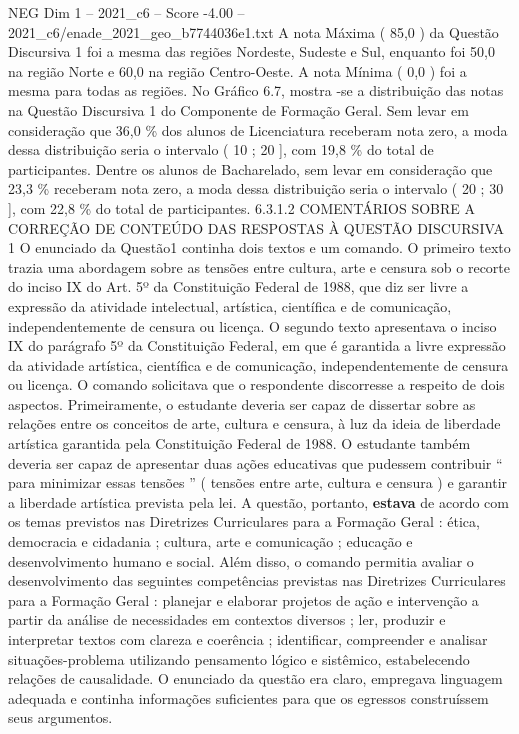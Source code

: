 \begin{textsample}{NEG Dim 1 – 2021\_c6 – Score -4.00 – 2021\_c6/enade\_2021\_geo\_b7744036e1.txt}
A nota Máxima ( 85,0 ) da Questão Discursiva 1 foi a mesma das regiões Nordeste, Sudeste e Sul, enquanto foi 50,0 na região Norte e 60,0 na região Centro-Oeste.
A nota Mínima ( 0,0 ) foi a mesma para todas as regiões.
No Gráfico 6.7, mostra -se a distribuição das notas na Questão Discursiva 1 do Componente de Formação Geral.
Sem levar em consideração que 36,0 \% dos alunos de Licenciatura receberam nota zero, a moda dessa distribuição seria o intervalo ( 10 ; 20 ], com 19,8 \% do total de participantes.
Dentre os alunos de Bacharelado, sem levar em consideração que 23,3 \% receberam nota zero, a moda dessa distribuição seria o intervalo ( 20 ; 30 ], com 22,8 \% do total de participantes. 6.3.1.2 COMENTÁRIOS SOBRE A CORREÇÃO DE CONTEÚDO DAS RESPOSTAS À QUESTÃO DISCURSIVA 1 O enunciado da Questão1 continha dois textos e um comando.
O primeiro texto trazia uma abordagem sobre as tensões entre cultura, arte e censura sob o recorte do inciso IX do Art. 5º da Constituição Federal de 1988, que diz ser livre a expressão da atividade intelectual, artística, científica e de comunicação, independentemente de censura ou licença.
O segundo texto apresentava o inciso IX do parágrafo 5º da Constituição Federal, em que é garantida a livre expressão da atividade artística, científica e de comunicação, independentemente de censura ou licença.
O comando solicitava que o respondente discorresse a respeito de dois aspectos.
Primeiramente, o estudante deveria ser capaz de dissertar sobre as relações entre os conceitos de arte, cultura e censura, à luz da ideia de liberdade artística garantida pela Constituição Federal de 1988.
O estudante também deveria ser capaz de apresentar duas ações educativas que pudessem contribuir “ para minimizar essas tensões ” ( tensões entre arte, cultura e censura ) e garantir a liberdade artística prevista pela lei.
A questão, portanto, \textbf{estava} de acordo com os temas previstos nas Diretrizes Curriculares para a Formação Geral : ética, democracia e cidadania ; cultura, arte e comunicação ; educação e desenvolvimento humano e social.
Além disso, o comando permitia avaliar o desenvolvimento das seguintes competências previstas nas Diretrizes Curriculares para a Formação Geral : planejar e elaborar projetos de ação e intervenção a partir da análise de necessidades em contextos diversos ; ler, produzir e interpretar textos com clareza e coerência ; identificar, compreender e analisar situações-problema utilizando pensamento lógico e sistêmico, estabelecendo relações de causalidade.
O enunciado da questão era claro, empregava linguagem adequada e continha informações suficientes para que os egressos construíssem seus argumentos.

\end{textsample}
